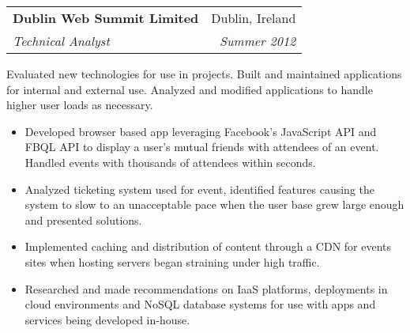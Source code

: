 \documentclass[11pt]{article}
\makeatletter
\newenvironment{resumeSubSectionHeader}{
    \par
    \begin{tabular*}{\textwidth}{l@{\extracolsep{\fill}}r}
    \par
} {
    \end{tabular*}
    \par
}
\newenvironment{resumeSubSectionBody}{
    \par
    \vspace{-0.2\parskip}
    \begin{small}
    \par
} {
    \par
    \end{small}
    \par
}
\newenvironment{resumeItemize}{
    \vspace{-0.5\baselineskip}
    \begin{itemize}
} {
    \end{itemize}
}
\makeatother
\begin{document}
%
%
\begin{resumeSubSectionHeader}

    \textbf{Dublin Web Summit Limited} & Dublin, Ireland   \\
    \emph{Technical Analyst}           & \emph{Summer 2012}

\end{resumeSubSectionHeader}
\begin{resumeSubSectionBody}

    Evaluated new technologies for use in projects.
    Built and maintained applications for internal and external use.
    Analyzed and modified applications to handle higher user loads
    as necessary.

    \begin{resumeItemize}
        \item
            Developed browser based app leveraging Facebook's JavaScript API and
            FBQL API to display a user's mutual friends with attendees of an
            event.
            Handled events with thousands of attendees within seconds.

        \item
            Analyzed ticketing system used for event, identified features
            causing the system to slow to an unacceptable pace when the
            user base grew large enough and presented solutions.

        \item
            Implemented caching and distribution of content through a CDN
            for events sites when hosting servers began straining under
            high traffic.

        \item
            Researched and made recommendations on IaaS platforms,
            deployments in cloud environments
            and NoSQL database systems for use with apps and services being
            developed in-house.
    \end{resumeItemize}

\end{resumeSubSectionBody}
\end{document}
